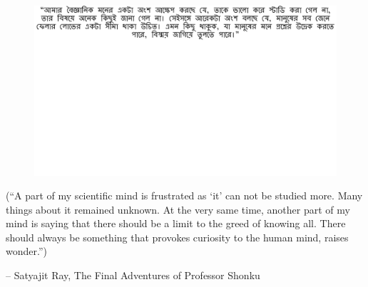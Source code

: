 \thispagestyle{empty}
{}

\vspace*{3cm}

\begin{center}
\begin{figure}
  \centering
  	\vspace{5cm}
    \includegraphics[width=\linewidth]{preamble/quote_1.pdf} 
\end{figure}
\vspace{-4cm}
\small
(``A part of my scientific mind is frustrated as `it' can not be studied more. Many things about it remained unknown. At the very same time, another part of my mind is saying that there should be a limit to the greed of knowing all. There should always be something that provokes curiosity to the human mind, raises wonder.'')

\vspace{2em}
 -- Satyajit Ray, The Final Adventures of Professor Shonku 
\end{center}

\medskip
